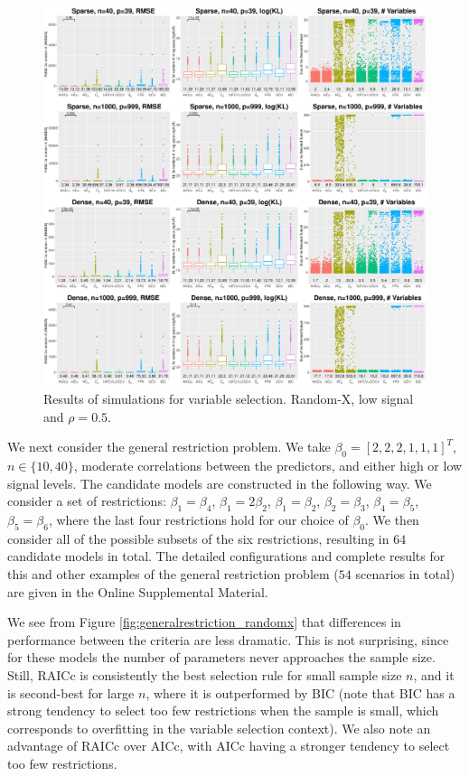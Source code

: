 \begin{figure}[!ht]
  \centering
  \includegraphics[width=\textwidth]{figures/main/randomx_VS_lsnr.eps}
  \caption{Results of simulations for variable selection. Random-X, low signal and $\rho=0.5$. }
  \label{fig:subsetselection_randomx_lsnr_largep}
\end{figure}

We next consider the general restriction problem. We take $\beta_0 = [2,2,2,1,1,1]^T$, $n\in\{10,40\}$, moderate correlations between the predictors, and either high or low signal levels. The candidate models are constructed in the following way. We consider a set of restrictions: $\beta_1=\beta_4$, $\beta_1=2\beta_2$, $\beta_1=\beta_2$, $\beta_2=\beta_3$, $\beta_4=\beta_5$, $\beta_5=\beta_6$, where the last four restrictions hold for our choice of $\beta_0$. We then consider all of the possible subsets of the six restrictions, resulting in $64$ candidate models in total. The detailed configurations and complete results for this and other examples of the general restriction problem ($54$ scenarios in total) are given in the Online Supplemental Material. 

We see from Figure \ref{fig:generalrestriction_randomx} that differences in performance between the criteria are less dramatic. This is not surprising, since for these models the number of parameters never approaches the sample size. Still, RAICc is consistently the best selection rule for small sample size $n$, and it is second-best for large $n$, where it is outperformed by BIC (note that BIC has a strong tendency to select too few restrictions when the sample is small, which corresponds to overfitting in the variable selection context). We also note an advantage of RAICc over AICc, with AICc having a stronger tendency to select too few restrictions.

